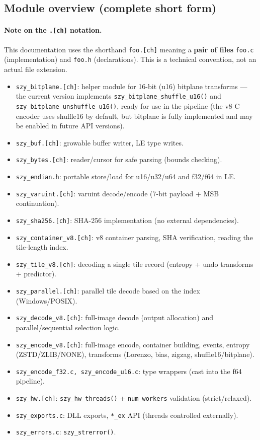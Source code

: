 \documentclass[11pt,a4paper]{article}
\begin{document}
\subsection{Module overview (complete short form)}
\label{subsec:modules_full_short}
\paragraph{Note on the \texttt{.[ch]} notation.}
This documentation uses the shorthand \texttt{foo.[ch]} meaning a \textbf{pair of files} \texttt{foo.c} (implementation) and \texttt{foo.h} (declarations). This is a technical convention, not an actual file extension.

\begin{itemize}
  \item \texttt{szy\_bitplane.[ch]}: helper module for 16-bit (u16) bitplane transforms --- the current version implements \texttt{szy\_bitplane\_shuffle\_u16()} and \texttt{szy\_bitplane\_unshuffle\_u16()}, ready for use in the pipeline (the v8 C encoder uses shuffle16 by default, but bitplane is fully implemented and may be enabled in future API versions).
  \item \texttt{szy\_buf.[ch]}: growable buffer writer, LE type writes.
  \item \texttt{szy\_bytes.[ch]}: reader/cursor for safe parsing (bounds checking).
  \item \texttt{szy\_endian.h}: portable store/load for u16/u32/u64 and f32/f64 in LE.
  \item \texttt{szy\_varuint.[ch]}: varuint decode/encode (7-bit payload + MSB continuation).
  \item \texttt{szy\_sha256.[ch]}: SHA-256 implementation (no external dependencies).
  \item \texttt{szy\_container\_v8.[ch]}: v8 container parsing, SHA verification, reading the tile-length index.
  \item \texttt{szy\_tile\_v8.[ch]}: decoding a single tile record (entropy + undo transforms + predictor).
  \item \texttt{szy\_parallel.[ch]}: parallel tile decode based on the index (Windows/POSIX).
  \item \texttt{szy\_decode\_v8.[ch]}: full-image decode (output allocation) and parallel/sequential selection logic.
  \item \texttt{szy\_encode\_v8.[ch]}: full-image encode, container building, events, entropy (ZSTD/ZLIB/NONE), transforms (Lorenzo, bias, zigzag, shuffle16/bitplane).
  \item \texttt{szy\_encode\_f32.c, szy\_encode\_u16.c}: type wrappers (cast into the f64 pipeline).
  \item \texttt{szy\_hw.[ch]}: \texttt{szy\_hw\_threads()} + \texttt{num\_workers} validation (strict/relaxed).
  \item \texttt{szy\_exports.c}: DLL exports, \texttt{*\_ex} API (threads controlled externally).
  \item \texttt{szy\_errors.c}: \texttt{szy\_strerror()}.
\end{itemize}
\end{document}
